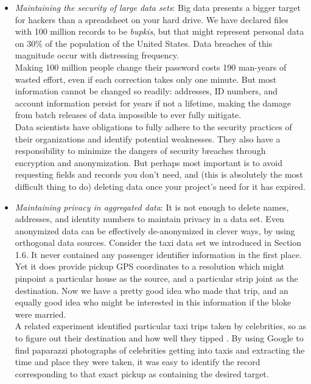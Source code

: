 \documentclass[10pt]{article}
\begin{document}
\begin{enumerate}
\begin{itemize}
  \item \textit{Maintaining the security of large data sets}: Big data presents a bigger target for hackers than a spreadsheet on your hard drive. We have declared files with 100 million records to be \textit{bupkis}, but that might represent personal data on $30\%$ of the population of the United States. Data breaches of this magnitude occur with distressing frequency.\\
Making 100 million people change their password costs 190 man-years of wasted effort, even if each correction takes only one minute. But most information cannot be changed so readily: addresses, ID numbers, and account information persist for years if not a lifetime, making the damage from batch releases of data impossible to ever fully mitigate.\\
Data scientists have obligations to fully adhere to the security practices of their organizations and identify potential weaknesses. They also have a responsibility to minimize the dangers of security breaches through encryption and anonymization. But perhaps most important is to avoid requesting fields and records you don't need, and (this is absolutely the most difficult thing to do) deleting data once your project's need for it has expired.

  \item \textit{Maintaining privacy in aggregated data}: It is not enough to delete names, addresses, and identity numbers to maintain privacy in a data set. Even anonymized data can be effectively de-anonymized in clever ways, by using orthogonal data sources. Consider the taxi data set we introduced in Section 1.6. It never contained any passenger identifier information in the first place. Yet it does provide pickup GPS coordinates to a resolution which might pinpoint a particular house as the source, and a particular strip joint as the destination. Now we have a pretty good idea who made that trip, and an equally good idea who might be interested in this information if the bloke were married.\\
A related experiment identified particular taxi trips taken by celebrities, so as to figure out their destination and how well they tipped \cite{Gay14}. By using Google to find paparazzi photographs of celebrities getting into taxis and extracting the time and place they were taken, it was easy to identify the record corresponding to that exact pickup as containing the desired target.
\end{itemize}


\end{enumerate}
\end{document}
